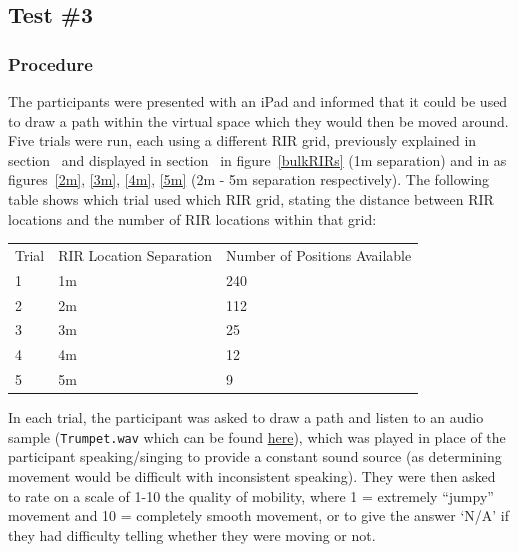 \documentclass[../../main.tex]{subfiles}
\begin{document}
		\subsection{Test \#3}
			\label{usertests:test3}

			\subsubsection{Procedure}
					The participants were presented with an iPad and informed that it could be used to draw a path within the virtual space which they would then be moved around. Five trials were run, each using a different \ac{RIR} grid, previously explained in section~ and displayed in section~  in figure~\ref{bulkRIRs} (1m separation) and in  as figures~\ref{2m}, \ref{3m}, \ref{4m}, \ref{5m} (2m - 5m separation respectively). The following table shows which trial used which \ac{RIR} grid, stating the distance between \ac{RIR} locations and the number of \ac{RIR} locations within that grid:

				\vspace{5mm}
				\begin{center}
					\begin{tabu} to 0.9\textwidth{X[1,c] X[2,c] X[2,c]}
					Trial & \ac{RIR} Location Separation & Number of Positions Available \\
						1 & 1m & 240 \\
						2 & 2m & 112 \\
						3 & 3m & 25 \\
						4 & 4m & 12 \\
						5 & 5m & 9 \\
					\end{tabu}
				\end{center}	
				\vspace{5mm}

				In each trial, the participant was asked to draw a path and listen to an audio sample \cite{trumpet} (\texttt{Trumpet.wav} which can be found \href{http://lt669.github.io/pages/audioSamples.html}{here}), which was played in place of the participant speaking/singing to provide a constant sound source (as determining movement would be difficult with inconsistent speaking). They were then asked to rate on a scale of 1-10 the quality of mobility, where 1 = extremely ``jumpy'' movement and 10 = completely smooth movement, or to give the answer `N/A' if they had difficulty telling whether they were moving or not.
\end{document}
